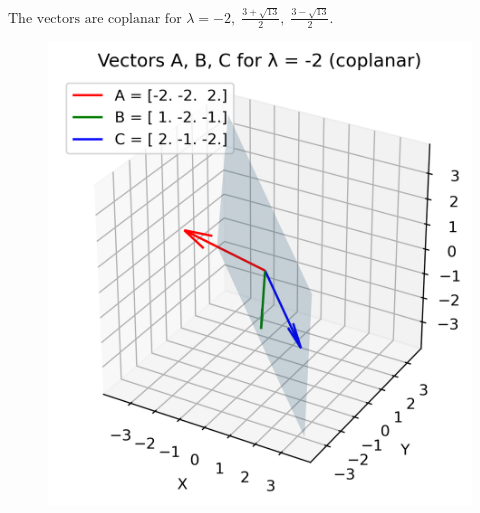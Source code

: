 \documentclass[journal]{IEEEtran}
\begin{document}
$\boxed{\text{The vectors are coplanar for } \lambda=-2, \; \tfrac{3+\sqrt{13}}{2}, \; \tfrac{3-\sqrt{13}}{2}.}$
\begin{figure}[H]
    \centering
	\includegraphics[width=0.86\columnwidth]{figs/01.png}
    \label{fig-1}
\end{figure}
\end{document}
